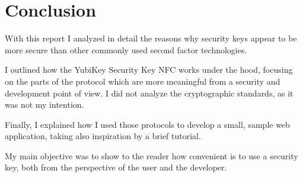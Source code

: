 \section{Conclusion}
With this report I analyzed in detail the reasons why security keys appear to be more secure than other commonly used second factor technologies.

I outlined how the YubiKey Security Key NFC works under the hood, focusing on the parts of the protocol which are more meaningful from a security and development point of view. I did not analyze the cryptographic standards, as it was not my intention.

Finally, I explained how I used those protocols to develop a small, sample web application, taking also inspiration by a brief tutorial.

My main objective was to show to the reader how convenient is to use a security key, both from the perspective of the user and the developer.